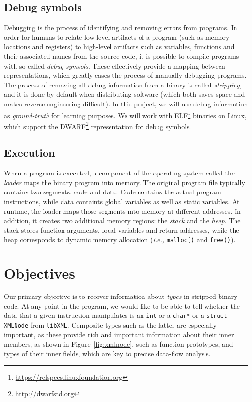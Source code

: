 \documentclass{article}
\begin{document}
\subsection{Debug symbols}
Debugging is the process of identifying and removing errors from programs. In order for humans to relate low-level artifacts of a program (such as memory locations and registers) to high-level artifacts such as variables, functions and their associated names from the source code, it is possible to compile programs with so-called \emph{debug symbols}. These effectively provide a mapping between representations, which greatly eases the process of manually debugging programs.
The process of removing all debug information from a binary is called \emph{stripping}, and it is done by default when distributing software (which both saves space and makes reverse-engineering difficult).
In this project, we will use debug information as \emph{ground-truth} for learning purposes. We will work with ELF\footnote{\url{https://refspecs.linuxfoundation.org}} binaries on Linux, which support the DWARF\footnote{\url{http://dwarfstd.org}} representation for debug symbols.

\subsection{Execution}
When a program is executed, a component of the operating system called the \emph{loader} maps the binary program into memory. The original program file typically contains two segments: code and data. Code contains the actual program instructions, while data containts global variables as well as static variables. At runtime, the loader maps those segments into memory at different addresses. In addition, it creates two additional memory regions: the \emph{stack} and the \emph{heap}. The stack stores function arguments, local variables and return addresses, while the heap corresponds to dynamic memory allocation (\textit{i.e.,} \texttt{malloc()} and \texttt{free()}).

\section{Objectives}
Our primary objective is to recover information about \emph{types} in stripped binary code. At any point in the program, we would like to be able to tell whether the data that a given instruction manipulates is an \texttt{int} or a \texttt{char*} or a \texttt{struct XMLNode} from \texttt{libXML}. Composite types such as the latter are especially important, as these provide rich and important information about their inner members, as shown in Figure~\ref{fig:xmlnode}, such as function prototypes, and types of their inner fields, which are key to precise data-flow analysis.
\end{document}
